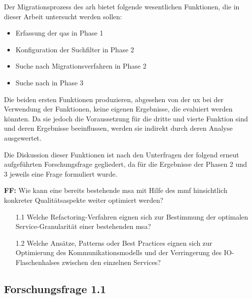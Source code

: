 Der Migrationsprozess des \gls{arh} bietet folgende wesentlichen Funktionen, die in dieser Arbeit untersucht werden sollen:
\begin{itemize}
	\item Erfassung der \glspl{qa} in Phase 1
	\item Konfiguration der Suchfilter in Phase 2
	\item Suche nach Migrationsverfahren in Phase 2
	\item Suche nach \bpp in Phase 3
\end{itemize}
Die beiden ersten Funktionen produzieren, abgesehen von der \gls{ux} bei der Verwendung der Funktionen, keine eigenen Ergebnisse, die evaluiert werden könnten.
Da sie jedoch die Voraussetzung für die dritte und vierte Funktion sind und deren Ergebnisse beeinflussen, werden sie indirekt durch deren Analyse ausgewertet.

Die Diskussion dieser Funktionen ist nach den Unterfragen der folgend erneut aufgeführten Forschungsfrage gegliedert, da für die Ergebnisse der Phasen 2 und 3 jeweils eine Frage formuliert wurde.

\textbf{FF:} Wie kann eine bereits bestehende \acrlong{msa} mit Hilfe des \acrfull{mmf} hinsichtlich konkreter Qualitätsaspekte weiter optimiert werden?
\begin{enumerate}
	\item[1.1] Welche Refactoring-Verfahren eignen sich zur Bestimmung der optimalen Service-Gra\-nu\-la\-ri\-tät einer bestehenden \acrlong{msa}?
	\item[1.2] Welche Ansätze, Patterns oder Best Practices eignen sich zur Optimierung des Kom\-mu\-ni\-ka\-tions\-mo\-dells und der Verringerung des IO-Flaschenhalses zwischen den einzelnen Services?
\end{enumerate}



\subsection{Forschungsfrage 1.1}


